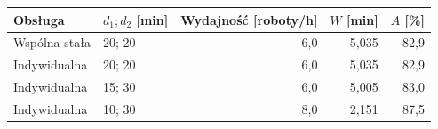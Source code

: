 \begin{tabular}{llrrr}
\toprule
Obsługa & $d_1;d_2$ [min] & Wydajność [roboty/h] & $W$ [min] & $A$ [\%] \\
\midrule
Wspólna stała & 20; 20 & 6,0 & 5,035 & 82,9 \\
Indywidualna & 20; 20 & 6,0 & 5,035 & 82,9 \\
Indywidualna & 15; 30 & 6,0 & 5,005 & 83,0 \\
Indywidualna & 10; 30 & 8,0 & 2,151 & 87,5 \\
\bottomrule
\end{tabular}
